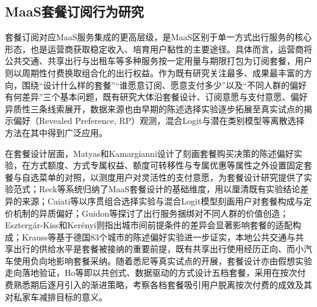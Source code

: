 \subsection{MaaS套餐订阅行为研究}\label{subsec.review.maas.bundle}

套餐订阅对应MaaS服务集成的更高层级，是MaaS区别于单一方式出行服务的核心形态，也是运营商获取稳定收入、培育用户黏性的主要途径。具体而言，运营商将公共交通、共享出行与出租车等多种服务按一定用量与期限打包为订阅套餐，用户则以周期性付费换取组合化的出行权益。作为既有研究关注最多、成果最丰富的方向，围绕``设计什么样的套餐''``谁愿意订阅、愿意支付多少''以及``不同人群的偏好有何差异''三个基本问题，既有研究大体沿套餐设计、订阅意愿与支付意愿、偏好异质性三条线索展开，数据来源也由早期的陈述选择实验逐步拓展至真实试点的揭示偏好（Revealed Preference, RP）观测，混合Logit与潜在类别模型等离散选择方法在其中得到广泛应用\citep{reckMaaSBundleDesign2020,hoDriversParticipantsChoices2021}。

在套餐设计层面，Matyas和Kamargianni\citep{matyasSurveyDesignExploring2019}设计了刻画套餐购买决策的陈述偏好实验，在方式额度、方式专属权益、额度可转移性与专属优惠等属性之外设置固定套餐与自选菜单的对照，以测度用户对灵活性的支付意愿，为套餐设计研究提供了实验范式；Reck等\citep{reckMaaSBundleDesign2020}系统归纳了MaaS套餐设计的基础维度，用以厘清既有实验结论差异的来源；Caiati等\citep{caiatiBundlingPricingSchemes2020}以序贯组合选择实验与混合Logit模型刻画用户对套餐构成与定价机制的异质偏好；Guidon等\citep{guidonTransportationServiceBundling2020}探讨了出行服务捆绑对不同人群的价值创造；Eszterg\'ar-Kiss和Ker\'enyi\citep{esztergar-kissCreationMobilityPackages2020}则指出城市间前提条件的差异会显著影响套餐的适配构成；Krauss等\citep{kraussHowDoesTransport2023}基于德国83个城市的陈述偏好实验进一步证实，本地公共交通与共享出行的供给水平是套餐被接纳的重要前提，既有共享出行使用经历正向、而小汽车使用负向地影响套餐采纳。随着悉尼等真实试点的开展，套餐设计亦由假想实验走向落地验证，Ho等\citep{hoMaaSBundleDesign2021}即以共创式、数据驱动的方式设计五档套餐，采用在按次付费熟悉期后逐月引入的渐进策略，考察各档套餐吸引用户脱离按次付费的成效及其对私家车减排目标的意义。

